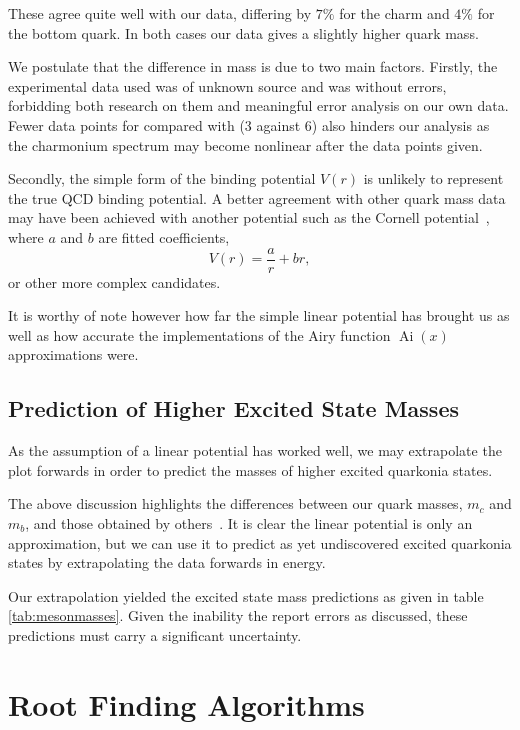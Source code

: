 \documentclass[]{article}
\newcommand{\Ai}[1]{\ensuremath{\operatorname{Ai}({#1})}}
\begin{document}

These agree quite well with our data, differing by $7\%$ for the charm and $4\%$ for the bottom quark. In both cases our data gives a slightly higher quark mass.

We postulate that the difference in mass is due to two main factors. Firstly, the experimental data used was of unknown source and was without errors, forbidding both research on them and meaningful error analysis on our own data. Fewer data points for \ccbar compared with \bbbar (3 against 6) also hinders our analysis as the charmonium spectrum may become nonlinear after the data points given.

Secondly, the simple form of the binding potential $V(r)$ is unlikely to represent the true QCD binding potential. A better agreement with other quark mass data may have been achieved with another potential such as the Cornell potential~\cite{ref:eichten}, where $a$ and $b$ are fitted coefficients,
\[
V(r) = \frac{a}{r} + br,
\]
or other more complex candidates.

It is worthy of note however how far the simple linear potential has brought us as well as how accurate the implementations of the Airy function $\Ai{x}$ approximations were.

\subsection{Prediction of Higher Excited State Masses}\label{ssec:highermasses}

As the assumption of a linear potential has worked well, we may extrapolate the plot forwards in order to predict the masses of higher excited quarkonia states.

The above discussion highlights the differences between our quark masses, $m_{c}$ and $m_{b}$, and those obtained by others~\cite{ref:pdg}. It is clear the linear potential is only an approximation, but we can use it to predict as yet undiscovered excited quarkonia states by extrapolating the data forwards in energy.

Our extrapolation yielded the excited state mass predictions as given in table \ref{tab:mesonmasses}. Given the inability the report errors as discussed, these predictions must carry a significant uncertainty.



\section{Root Finding Algorithms}\label{sec:algorithms}
\end{document}
